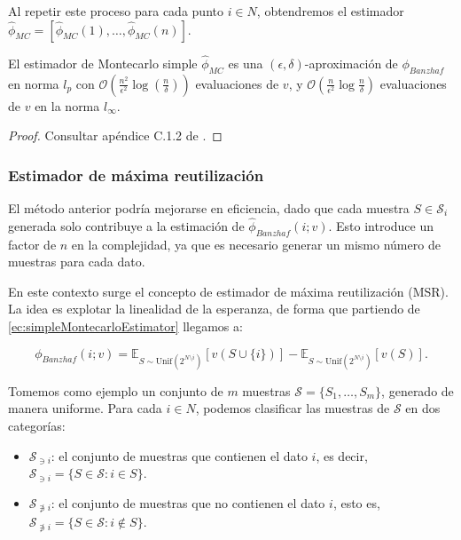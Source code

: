 Al repetir este proceso para cada punto $i \in N$, obtendremos
el estimador $\hat{\phi}_{MC} = [\hat{\phi}_{MC}(1),\dots,
\hat{\phi}_{MC}(n)]$.


\begin{theorem}
  El estimador de Montecarlo simple $\hat{\phi}_{MC}$
  es una $(\epsilon,\delta)$-aproximación de $\phi_{Banzhaf}$
  en norma $l_p$ con $\mathcal{O}(\frac{n^2}{\epsilon^2}
  \log(\frac{n}{\delta}))$ evaluaciones de $v$, y
  $\mathcal{O}(\frac{n}{\epsilon^2}
  \log{\frac{n}{\delta}})$ evaluaciones de $v$ en la norma
  $l_{\infty}$.
\end{theorem}

\begin{proof}
  Consultar apéndice C.1.2 de \cite{dataBanzhaf}.
\end{proof}

\subsubsection*{Estimador de máxima reutilización}

El método anterior podría mejorarse en eficiencia,
dado que cada muestra $S \in \mathcal{S}_i$ generada
solo contribuye a la estimación de
$\hat{\phi}_{Banzhaf}(i;v)$. Esto introduce un
factor de $n$ en la complejidad, ya que es necesario
generar un mismo número de muestras para cada dato.

En este contexto surge el concepto de
estimador de máxima reutilización (MSR)\cite{dataBanzhaf}.
La idea es explotar la linealidad de la esperanza, de forma que
partiendo de \ref{ec:simpleMontecarloEstimator} llegamos a:

\begin{equation}
  \label{maximumSampleReuse}
  \phi_{Banzhaf}(i;v) = \mathbb{E}_{S \sim \text{Unif}(2^{N\setminus i})}
  [v(S \cup \{i\})] - 
  \mathbb{E}_{S \sim \text{Unif}(2^{N\setminus i})}
  [v(S)].
\end{equation}

Tomemos como ejemplo un conjunto de $m$ muestras
$\mathcal{S} = \{S_1,\dots,S_m\}$, generado de manera
uniforme. Para cada $i \in N$, podemos clasificar las
muestras de $\mathcal{S}$ en dos categorías:

\begin{itemize}
  \item $\mathcal{S}_{\ni i}$: el conjunto de muestras
  que contienen el dato $i$, es decir,
  $\mathcal{S}_{\ni i} = \{S \in \mathcal{S}: i \in S\}$.
  \item $\mathcal{S}_{\not \ni  i}$: el conjunto de muestras
  que no contienen el dato $i$, esto es,
  $\mathcal{S}_{\not \ni  i} = \{S \in \mathcal{S}: i \not
  \in S\}$.
\end{itemize}

